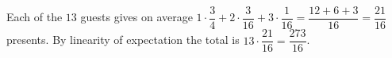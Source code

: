 Each of the $13$ guests gives on average $1\cdot\dfrac34+2\cdot\dfrac3{16}+3\cdot\dfrac1{16}=\dfrac{12+6+3}{16}=\dfrac{21}{16}$ presents. By linearity of expectation the total is $13\cdot\dfrac{21}{16}=\boxed{\dfrac{273}{16}}$.

